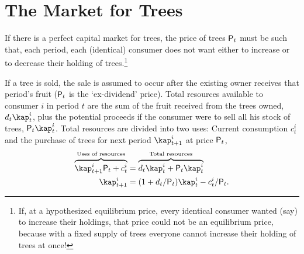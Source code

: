 \documentclass{\handout}
\begin{document}
\hypertarget{the-market-for-trees}{}
\section{The Market for Trees}

If there is a perfect capital market for trees, the price of trees $\mathsf{P}_{t}$ must be such that, each period, each (identical) consumer does not want either to increase or to decrease their holding of trees.\footnote{If, at a hypothesized equilibrium price, every identical consumer wanted (say) to increase their holdings, that price could not be an equilibrium price, because with a fixed supply of trees everyone cannot increase their holding of trees at once!}

If a tree is sold, the sale is assumed to occur after the existing owner receives that period's fruit ($\mathsf{P}_{t}$ is the `ex-dividend' price).  Total resources available to consumer $i$ in period $t$ are the sum of the fruit received from the trees owned, $\dvdnd_{t}\kap_{t}^{i}$, plus the potential proceeds if the consumer were to sell all his stock of trees, $\Price_{t}\kap_{t}^{i}$.  Total resources are divided into two uses: Current consumption $c_{t}^{i}$ and the purchase of trees for next period $\kap_{t+1}^{i}$ at price $\mathsf{P}_{t}$,
\begin{equation}\begin{gathered}\begin{aligned}
\overbrace{\kap_{t+1}^{i}\Price_{t}+c_{t}^{i}}^{\text{Uses of resources}}     & =  \overbrace{\dvdnd_{t}\kap_{t}^{i}+\Price_{t}\kap_{t}^{i}}^{\text{Total resources}} 
\\      \kap_{t+1}^{i} & =  (1+\dvdnd_{t}/\Price_{t})\kap_{t}^{i}-c_{t}^{i}/\Price_{t}.
\end{aligned}\end{gathered}\end{equation}

\hypertarget{the-problem-of-an-individual-consumer}{}
\end{document}
